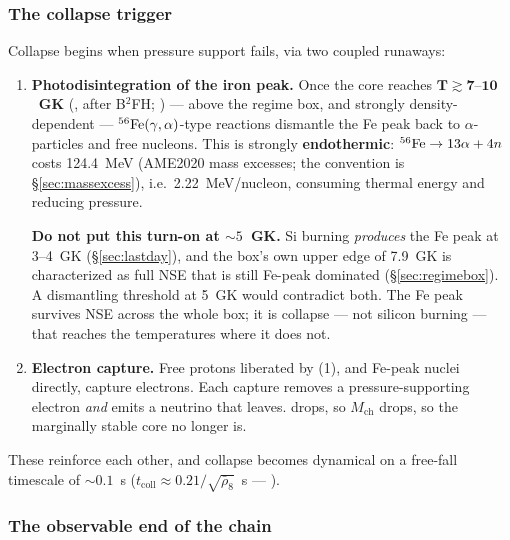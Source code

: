 \subsubsection{The collapse trigger}
\label{sec:collapsetrigger}

Collapse begins when pressure support fails, via two coupled runaways:

\begin{enumerate}
\item \textbf{Photodisintegration of the iron peak.} Once the core reaches
      $\boldsymbol{T \gtrsim 7\text{--}10}$~\textbf{GK} (\citealt{janka2012},
      after B$^2$FH; \citealt{b2fh1957}) --- above the regime box, and strongly
      density-dependent --- $\nuc{Fe}{56}(\gamma,\alpha)$-type reactions
      dismantle the Fe peak back to $\alpha$-particles and free nucleons. This
      is strongly \textbf{endothermic}: $\nuc{Fe}{56} \to 13\alpha + 4n$ costs
      124.4~MeV (AME2020 mass excesses; the convention is
      \S\ref{sec:massexcess}), i.e.\ 2.22~MeV/nucleon, consuming thermal energy
      and reducing pressure.

      \begin{warn}
      \textbf{Do not put this turn-on at ${\sim}5$~GK.} Si burning
      \emph{produces} the Fe peak at 3--4~GK (\S\ref{sec:lastday}), and the
      box's own upper edge of 7.9~GK is characterized as full NSE that is
      still Fe-peak dominated (\S\ref{sec:regimebox}). A dismantling threshold
      at 5~GK would contradict both. The Fe peak survives NSE across the whole
      box; it is collapse --- not silicon burning --- that reaches the
      temperatures where it does not.
      \end{warn}

\item \textbf{Electron capture.} Free protons liberated by (1), and Fe-peak
      nuclei directly, capture electrons. Each capture removes a
      pressure-supporting electron \emph{and} emits a neutrino that leaves.
      \Ye{} drops, so $M_{\mathrm{ch}}$ drops, so the marginally stable core no
      longer is.
\end{enumerate}

These reinforce each other, and collapse becomes dynamical on a free-fall
timescale of ${\sim}0.1$~s ($t_{\mathrm{coll}} \approx 0.21/\sqrt{\bar\rho_8}$~s
--- \citealt{janka2012}).

\subsubsection{The observable end of the chain}
\label{sec:observableend}

